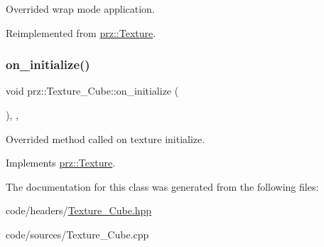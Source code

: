 Overrided wrap mode application. 



Reimplemented from \mbox{\hyperlink{classprz_1_1_texture_ad68b4a5a4032f74d3ea719f26f78b202}{prz\+::\+Texture}}.

\mbox{\label{classprz_1_1_texture___cube_a428b68f8ceb7476a5780469a40084fab}} 
\subsubsection{\texorpdfstring{on\_initialize()}{on\_initialize()}}
{\footnotesize\ttfamily void prz\+::\+Texture\+\_\+\+Cube\+::on\+\_\+initialize (\begin{DoxyParamCaption}{ }\end{DoxyParamCaption})\hspace{0.3cm}{\ttfamily [override]}, {\ttfamily [protected]}, {\ttfamily [virtual]}}



Overrided method called on texture initialize. 



Implements \mbox{\hyperlink{classprz_1_1_texture_a75b9d1ba9920727d99e4c167c900fa32}{prz\+::\+Texture}}.



The documentation for this class was generated from the following files\+:\begin{DoxyCompactItemize}
\item 
code/headers/\mbox{\hyperlink{_texture___cube_8hpp}{Texture\+\_\+\+Cube.\+hpp}}\item 
code/sources/Texture\+\_\+\+Cube.\+cpp\end{DoxyCompactItemize}
